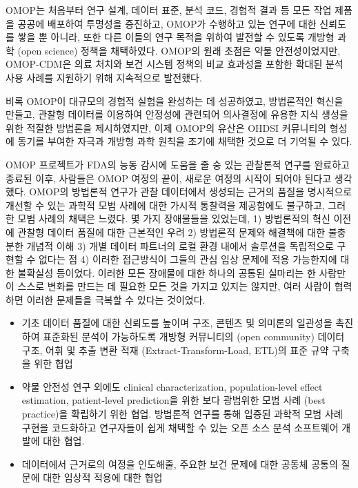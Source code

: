 \documentclass[11pt]{book}
\providecommand{\tightlist}{%
  \setlength{\itemsep}{0pt}\setlength{\parskip}{0pt}}
\theoremstyle{definition}
\theoremstyle{definition}
\theoremstyle{definition}
\theoremstyle{remark}
\begin{document}
OMOP는 처음부터 연구 설계, 데이터 표준, 분석 코드, 경험적 결과 등 모든
작업 제품을 공공에 배포하여 투명성을 증진하고, OMOP가 수행하고 있는
연구에 대한 신뢰도를 쌓을 뿐 아니라, 또한 다른 이들의 연구 목적을 위하여
발전할 수 있도록 개방형 과학 (open science) 정책을 채택하였다. OMOP의
원래 초점은 약물 안전성이었지만, OMOP-CDM은 의료 처치와 보건 시스템
정책의 비교 효과성을 포함한 확대된 분석 사용 사례를 지원하기 위해
지속적으로 발전했다.

비록 OMOP이 대규모의 경험적 실험을 완성하는 데 성공하였고,
\citep{ryan2012omop, ryan2013omop} 방법론적인 혁신을 만들고,
\citep{schuemie_2014} 관찰형 데이터를 이용하여 안정성에 관련되어
의사결정에 유용한 지식 생성을 위한 적절한 방법론을 제시하였지만,
\citep{madigan_2013, madigan2013design} 이제 OMOP의 유산은 OHDSI
커뮤니티의 형성에 동기를 부여한 자극과 개방형 과학 원칙을 조기에 채택한
것으로 더 기억될 수 있다.

OMOP 프로젝트가 FDA의 능동 감시에 도움을 줄 숭 있는 관찰론적 연구를
완료하고 종료된 이후, 사람들은 OMOP 여정의 끝이, 새로운 여정의 시작이
되어야 된다고 생각했다. OMOP의 방법론적 연구가 관찰 데이터에서 생성되는
근거의 품질을 명시적으로 개선할 수 있는 과학적 모범 사례에 대한 가시적
통찰력을 제공함에도 불구하고, 그러한 모범 사례의 채택은 느렸다. 몇 가지
장애물들을 있었는데, 1) 방법론적의 혁신 이전에 관찰형 데이터 품질에 대한
근본적인 우려 2) 방법론적 문제와 해결책에 대한 불충분한 개념적 이해 3)
개별 데이터 파트너의 로컬 환경 내에서 솔루션을 독립적으로 구현할 수
없다는 점 4) 이러한 접근방식이 그들의 관심 임상 문제에 적용 가능한지에
대한 불확실성 등이었다. 이러한 모든 장애물에 대한 하나의 공통된 실마리는
한 사람만이 스스로 변화를 만드는 데 필요한 모든 것을 가지고 있지는
않지만, 여러 사람이 협력하면 이러한 문제들을 극복할 수 있다는 것이었다.

\begin{itemize}
\tightlist
\item
  기초 데이터 품질에 대한 신뢰도를 높이며 구조, 콘텐츠 및 의미론의
  일관성을 촉진하여 표준화된 분석이 가능하도록 개방형 커뮤니티의 (open
  community) 데이터 구조, 어휘 및 추출 변환 적재
  (Extract-Transform-Load, ETL)의 표준 규약 구축을 위한 협업
\item
  약물 안전성 연구 외에도 clinical characterization, population-level
  effect estimation, patient-level prediction을 위한 보다 광범위한 모범
  사례 (best practice)을 확립하기 위한 협업. 방법론적 연구를 통해 입증된
  과학적 모범 사례 구현을 코드화하고 연구자들이 쉽게 채택할 수 있는 오픈
  소스 분석 소프트웨어 개발에 대한 협업.
\item
  데이터에서 근거로의 여정을 인도해줄, 주요한 보건 문제에 대한 공동체
  공통의 질문에 대한 임상적 적용에 대한 협업
\end{itemize}
\end{document}
